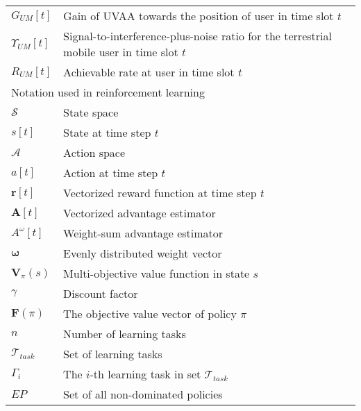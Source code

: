 \documentclass[10pt,journal,compsoc]{IEEEtran}
\begin{document}
\begin{table}[]
\begin{tabular}{@{} p{1.2cm} p{7.2cm} @{}}
$G_{UM}[t]$ & Gain of UVAA towards the position of user in time slot $t$ \\
$\Upsilon_{UM}[t]$ & Signal-to-interference-plus-noise ratio for the terrestrial mobile user in time slot $t$ \\
$R_{UM}[t]$ & Achievable rate at user in time slot $t$ \\ 
\hline
\multicolumn{2}{l}{\centering Notation used in reinforcement learning} \\
\hline
$\mathcal{S}$ & State space \\
$s[t]$ & State at time step $t$ \\
$\mathcal{A}$ & Action space \\
$a[t]$ & Action at time step $t$ \\
$\boldsymbol{r}[t]$ & Vectorized reward function at time step $t$\\
$\textbf{A}[t]$ & Vectorized advantage estimator \\
$A^{\omega}[t]$ & Weight-sum advantage estimator \\
$\boldsymbol{\omega}$ & Evenly distributed weight vector \\
$\boldsymbol{V}_{\pi}(s)$ & Multi-objective value function in state $s$ \\
$\gamma$ & Discount factor \\
$\boldsymbol{F}(\pi)$ & The objective value vector of policy $\pi$ \\
$n$ & Number of learning tasks \\
$\mathcal{T}_{task}$ & Set of learning tasks \\
$\Gamma_i$ & The $i$-th learning task in set $\mathcal{T}_{task}$ \\
$EP$ & Set of all non-dominated policies \\
\bottomrule
\end{tabular}
\end{table}
\end{document}
